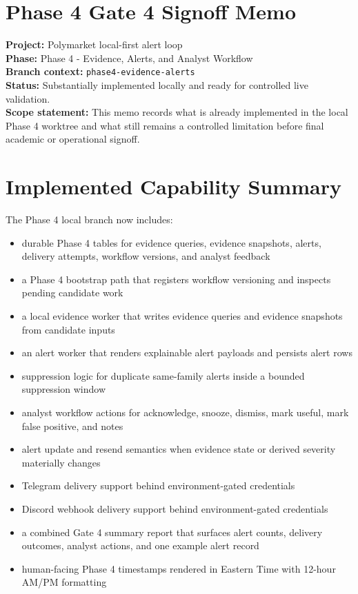 \documentclass{article}
\begin{document}
\section*{Phase 4 Gate 4 Signoff Memo}

\textbf{Project:} Polymarket local-first alert loop\\
\textbf{Phase:} Phase 4 - Evidence, Alerts, and Analyst Workflow\\
\textbf{Branch context:} \texttt{phase4-evidence-alerts}\\
\textbf{Status:} Substantially implemented locally and ready for controlled live validation.\\
\textbf{Scope statement:} This memo records what is already implemented in the local Phase 4 worktree and what still remains a controlled limitation before final academic or operational signoff.

\section*{Implemented Capability Summary}
The Phase 4 local branch now includes:
\begin{itemize}
\item durable Phase 4 tables for evidence queries, evidence snapshots, alerts, delivery attempts, workflow versions, and analyst feedback
\item a Phase 4 bootstrap path that registers workflow versioning and inspects pending candidate work
\item a local evidence worker that writes evidence queries and evidence snapshots from candidate inputs
\item an alert worker that renders explainable alert payloads and persists alert rows
\item suppression logic for duplicate same-family alerts inside a bounded suppression window
\item analyst workflow actions for acknowledge, snooze, dismiss, mark useful, mark false positive, and notes
\item alert update and resend semantics when evidence state or derived severity materially changes
\item Telegram delivery support behind environment-gated credentials
\item Discord webhook delivery support behind environment-gated credentials
\item a combined Gate 4 summary report that surfaces alert counts, delivery outcomes, analyst actions, and one example alert record
\item human-facing Phase 4 timestamps rendered in Eastern Time with 12-hour AM/PM formatting
\end{itemize}
\end{document}
